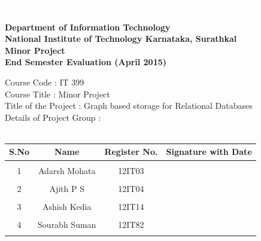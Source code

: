 \documentclass[12pt, oneside]{book}
\begin{document}
 \pagebreak \textcolor{white}{text}
\thispagestyle{empty}
\begin{center}
\Large
\textbf{Department of Information Technology} \\
\normalsize
\textbf{National Institute of Technology Karnataka, Surathkal} \\
\vspace{1cm} \Large
\textbf{Minor Project} \\ \vspace{0.5cm}
\textbf{End Semester Evaluation (April 2015)}
\vspace{1cm}
\end{center}
Course Code : IT 399 \\
Course Title : Minor Project \\
Title of the Project : Graph based storage for Relational Databases \\
Details of Project Group : \\
\vspace{5mm}
\\
\begin{table}[h!]
  \begin{center}
   \begin{tabular}{ p{} | p{} | p{} | p{} }
      \hline
      \multicolumn{1}{|c|}{\textbf{S.No}} & \multicolumn{1}{c|}{\textbf{Name}} & \multicolumn{1}{c|}{\textbf{Register No.}} & \multicolumn{1}{c|}{\textbf{Signature with Date}} \\ \hline
      \multicolumn{1}{c}{} & \multicolumn{1}{c}{} & \multicolumn{1}{c}{} & \multicolumn{1}{c}{\hspace{4cm}}\\
      \multicolumn{1}{c}{1} & \multicolumn{1}{c}{Adarsh Mohata} & \multicolumn{1}{c}{12IT03} & \multicolumn{1}{c}{}\\
      \multicolumn{1}{c}{} & \multicolumn{1}{c}{} & \multicolumn{1}{c}{} & \multicolumn{1}{c}{}\\
      \multicolumn{1}{c}{2} & \multicolumn{1}{c}{Ajith P S} & \multicolumn{1}{c}{12IT04} & \multicolumn{1}{c}{}\\
      \multicolumn{1}{c}{} & \multicolumn{1}{c}{} & \multicolumn{1}{c}{} & \multicolumn{1}{c}{}\\
      \multicolumn{1}{c}{3} & \multicolumn{1}{c}{Ashish Kedia} & \multicolumn{1}{c}{12IT14} & \multicolumn{1}{c}{}\\
      \multicolumn{1}{c}{} & \multicolumn{1}{c}{} & \multicolumn{1}{c}{} & \multicolumn{1}{c}{}\\
      \multicolumn{1}{c}{4} & \multicolumn{1}{c}{Sourabh Suman} & \multicolumn{1}{c}{12IT82} & \multicolumn{1}{c}{}\\
      \multicolumn{1}{c}{} & \multicolumn{1}{c}{} & \multicolumn{1}{c}{} & \multicolumn{1}{c}{}\\
   \end{tabular}

  \end{center}

\end{table}
\end{document}

